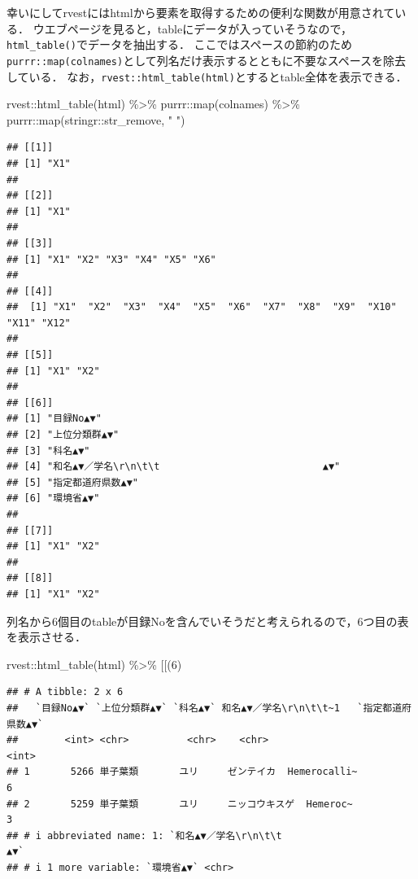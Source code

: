 \documentclass[
]{article}
\newenvironment{Shaded}{\begin{snugshade}}{\end{snugshade}}
\newcommand{\AttributeTok}[1]{\textcolor[rgb]{0.77,0.63,0.00}{#1}}
\newcommand{\DecValTok}[1]{\textcolor[rgb]{0.00,0.00,0.81}{#1}}
\newcommand{\FunctionTok}[1]{\textcolor[rgb]{0.00,0.00,0.00}{#1}}
\newcommand{\NormalTok}[1]{#1}
\newcommand{\SpecialCharTok}[1]{\textcolor[rgb]{0.00,0.00,0.00}{#1}}
\newcommand{\StringTok}[1]{\textcolor[rgb]{0.31,0.60,0.02}{#1}}
\begin{document}
幸いにしてrvestにはhtmlから要素を取得するための便利な関数が用意されている．
ウエブページを見ると，tableにデータが入っていそうなので，\texttt{html\_table()}でデータを抽出する．
ここではスペースの節約のため\texttt{purrr::map(colnames)}として列名だけ表示するとともに不要なスペースを除去している．
なお，\texttt{rvest::html\_table(html)}とするとtable全体を表示できる．

\begin{Shaded}
\begin{Highlighting}[]
\NormalTok{rvest}\SpecialCharTok{::}\FunctionTok{html\_table}\NormalTok{(html) }\SpecialCharTok{\%\textgreater{}\%}
\NormalTok{  purrr}\SpecialCharTok{::}\FunctionTok{map}\NormalTok{(colnames) }\SpecialCharTok{\%\textgreater{}\%}
\NormalTok{  purrr}\SpecialCharTok{::}\FunctionTok{map}\NormalTok{(stringr}\SpecialCharTok{::}\NormalTok{str\_remove, }\StringTok{" "}\NormalTok{)}
\end{Highlighting}
\end{Shaded}

\begin{verbatim}
## [[1]]
## [1] "X1"
## 
## [[2]]
## [1] "X1"
## 
## [[3]]
## [1] "X1" "X2" "X3" "X4" "X5" "X6"
## 
## [[4]]
##  [1] "X1"  "X2"  "X3"  "X4"  "X5"  "X6"  "X7"  "X8"  "X9"  "X10" "X11" "X12"
## 
## [[5]]
## [1] "X1" "X2"
## 
## [[6]]
## [1] "目録No▲▼"                                            
## [2] "上位分類群▲▼"                                        
## [3] "科名▲▼"                                              
## [4] "和名▲▼／学名\r\n\t\t                            ▲▼"
## [5] "指定都道府県数▲▼"                                    
## [6] "環境省▲▼"                                            
## 
## [[7]]
## [1] "X1" "X2"
## 
## [[8]]
## [1] "X1" "X2"
\end{verbatim}

列名から6個目のtableが目録Noを含んでいそうだと考えられるので，6つ目の表を表示させる．

\begin{Shaded}
\begin{Highlighting}[]
\NormalTok{rvest}\SpecialCharTok{::}\FunctionTok{html\_table}\NormalTok{(html) }\SpecialCharTok{\%\textgreater{}\%}
  \StringTok{\textasciigrave{}}\AttributeTok{[[}\StringTok{\textasciigrave{}}\NormalTok{(}\DecValTok{6}\NormalTok{)}
\end{Highlighting}
\end{Shaded}

\begin{verbatim}
## # A tibble: 2 x 6
##   `目録No▲▼` `上位分類群▲▼` `科名▲▼` 和名▲▼／学名\r\n\t\t~1   `指定都道府県数▲▼`
##        <int> <chr>          <chr>    <chr>                                 <int>
## 1       5266 単子葉類       ユリ     ゼンテイカ  Hemerocalli~                  6
## 2       5259 単子葉類       ユリ     ニッコウキスゲ  Hemeroc~                  3
## # i abbreviated name: 1: `和名▲▼／学名\r\n\t\t                             ▲▼`
## # i 1 more variable: `環境省▲▼` <chr>
\end{verbatim}
\end{document}
